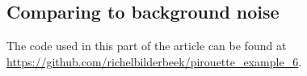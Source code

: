 





\subsection{Comparing to background noise}

The code used in this part of the article can be found at 
\url{https://github.com/richelbilderbeek/pirouette_example_6}. 

